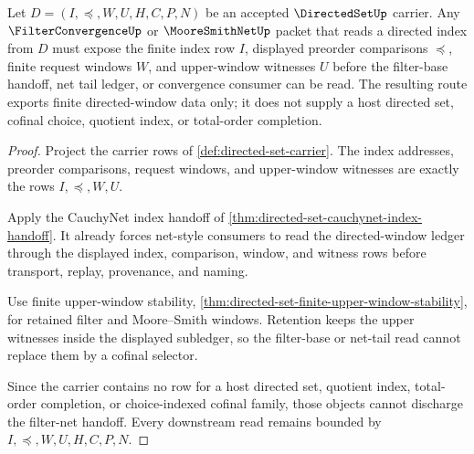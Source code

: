 \begin{theorem}
\label{thm:directed-set-filter-net-handoff}
Let $D=(I,\preceq,W,U,H,C,P,N)$ be an accepted $\DirectedSetUp$ carrier. Any $\FilterConvergenceUp$ or $\MooreSmithNetUp$ packet that reads a directed index from $D$ must expose the finite index row $I$, displayed preorder comparisons $\preceq$, finite request windows $W$, and upper-window witnesses $U$ before the filter-base handoff, net tail ledger, or convergence consumer can be read. The resulting route exports finite directed-window data only; it does not supply a host directed set, cofinal choice, quotient index, or total-order completion.
\end{theorem}
\begin{proof}
Project the carrier rows of \autoref{def:directed-set-carrier}. The index addresses, preorder comparisons, request windows, and upper-window witnesses are exactly the rows $I,\preceq,W,U$.

Apply the CauchyNet index handoff of \autoref{thm:directed-set-cauchynet-index-handoff}. It already forces net-style consumers to read the directed-window ledger through the displayed index, comparison, window, and witness rows before transport, replay, provenance, and naming.

Use finite upper-window stability, \autoref{thm:directed-set-finite-upper-window-stability}, for retained filter and Moore--Smith windows. Retention keeps the upper witnesses inside the displayed subledger, so the filter-base or net-tail read cannot replace them by a cofinal selector.

Since the carrier contains no row for a host directed set, quotient index, total-order completion, or choice-indexed cofinal family, those objects cannot discharge the filter-net handoff. Every downstream read remains bounded by $I,\preceq,W,U,H,C,P,N$.
\end{proof}

